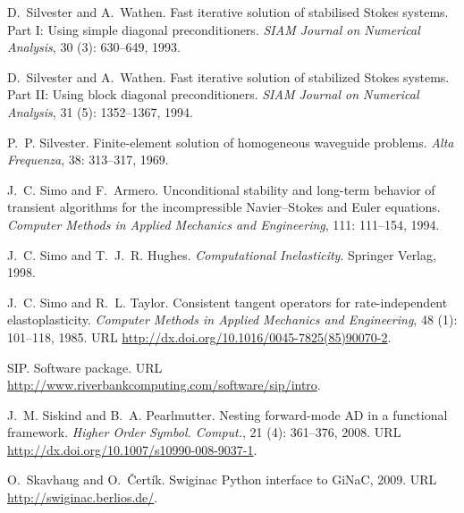 \begin{thebibliography}{467}
D.~Silvester and A.~Wathen.
\newblock Fast iterative solution of stabilised {S}tokes systems. {P}art {I}:
  {U}sing simple diagonal preconditioners.
\newblock \emph{SIAM Journal on Numerical Analysis}, 30 (3):
  630--649, 1993.

D.~Silvester and A.~Wathen.
\newblock Fast iterative solution of stabilized {S}tokes systems. {P}art {II}:
  {U}sing block diagonal preconditioners.
\newblock \emph{SIAM Journal on Numerical Analysis}, 31 (5):
  1352--1367, 1994.

P.~P. Silvester.
\newblock Finite-element solution of homogeneous waveguide problems.
\newblock \emph{Alta Frequenza}, 38: 313--317, 1969.

J.~C. Simo and F.~Armero.
\newblock Unconditional stability and long-term behavior of transient
  algorithms for the incompressible {N}avier--{S}tokes and {E}uler equations.
\newblock \emph{Computer Methods in Applied Mechanics and Engineering},
  111: 111--154, 1994.

J.~C. Simo and T.~J.~R. Hughes.
\newblock \emph{Computational Inelasticity}.
\newblock Springer Verlag, 1998.

J.~C. Simo and R.~L. Taylor.
\newblock Consistent tangent operators for rate-independent elastoplasticity.
\newblock \emph{Computer Methods in Applied Mechanics and Engineering},
  48 (1): 101--118, 1985.
\newblock URL \url{http://dx.doi.org/10.1016/0045-7825(85)90070-2}.

SIP.
\newblock Software package.
\newblock URL \url{http://www.riverbankcomputing.com/software/sip/intro}.

J.~M. Siskind and B.~A. Pearlmutter.
\newblock Nesting forward-mode {AD} in a functional framework.
\newblock \emph{Higher Order Symbol. Comput.}, 21 (4):
  361--376, 2008.
\newblock URL \url{http://dx.doi.org/10.1007/s10990-008-9037-1}.

O.~Skavhaug and O.~\v{C}ert\'{i}k.
\newblock Swiginac {P}ython interface to {GiNaC}, 2009.
\newblock URL \url{http://swiginac.berlios.de/}.


\end{thebibliography}
